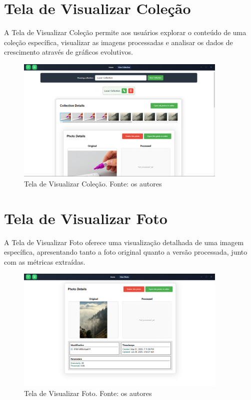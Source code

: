 \section{Tela de Visualizar Coleção}

A Tela de Visualizar Coleção permite aos usuários explorar o conteúdo de uma coleção específica, visualizar as imagens processadas e analisar os dados de crescimento através de gráficos evolutivos.

\begin{figure}[H]
    \centering
    \includegraphics[width=0.9\textwidth]{../figures/hci/view_collection.png}
    \caption{Tela de Visualizar Coleção. Fonte: os autores}
    \label{fig:view-collection}
\end{figure}

\section{Tela de Visualizar Foto}

A Tela de Visualizar Foto oferece uma visualização detalhada de uma imagem específica, apresentando tanto a foto original quanto a versão processada, junto com as métricas extraídas.

\begin{figure}[H]
    \centering
    \includegraphics[width=0.9\textwidth]{../figures/hci/view_photo.png}
    \caption{Tela de Visualizar Foto. Fonte: os autores}
    \label{fig:view-photo}
\end{figure}

